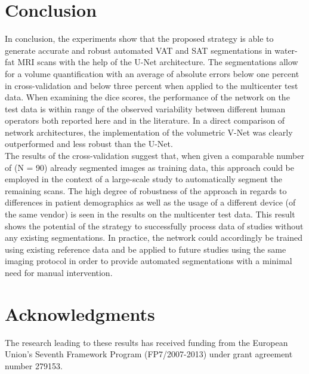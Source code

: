 \documentclass[10pt,letterpaper]{article}
\begin{document}
	\section*{Conclusion}

	In conclusion, the experiments show that the proposed strategy is able to generate accurate and robust automated VAT and SAT segmentations in water-fat MRI scans with the help of the U-Net architecture. The segmentations allow for a volume quantification with an average of absolute errors below one percent in cross-validation and below three percent when applied to the multicenter test data. When examining the dice scores, the performance of the network on the test data is within range of the observed variability between different human operators both reported here and in the literature. In a direct comparison of network architectures, the implementation of the volumetric V-Net was clearly outperformed and less robust than the U-Net. \\
	The results of the cross-validation suggest that, when given a comparable number of (N = 90) already segmented images as training data, this approach could be employed in the context of a large-scale study to automatically segment the remaining scans. The high degree of robustness of the approach in regards to differences in patient demographics as well as the usage of a different device (of the same vendor) is seen in the results on the multicenter test data. This result shows the potential of the strategy to successfully process data of studies without any existing segmentations. In practice, the network could accordingly be trained using existing reference data and be applied to future studies using the same imaging protocol in order to provide automated segmentations with a minimal need for manual intervention.


	\section*{Acknowledgments}

	The research leading to these results has received funding from the European Union's Seventh Framework Program (FP7/2007-2013) under grant agreement number 279153.



	


	

	\pagebreak
\end{document}
